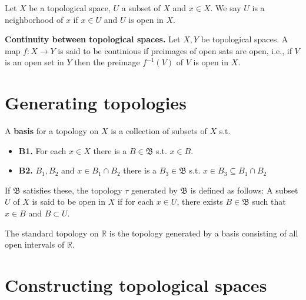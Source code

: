 \documentclass{article}
\theoremstyle{remark}
\begin{document}
\begin{definition}[Neighbourhoods]
    Let $X$ be a topological space,  $U$ a subset of $X$ and $x \in  X$. We say $ U$ is a neighborhood of $x$ if $ x \in
    U $ and $U$ is open in $X$.
\end{definition}

\begin{theorem}
    \textbf{Continuity between topological spaces.}
Let $X,Y$ be topological spaces. A map $f: X \to Y$ is said to be continious if preimages of open sats are open, i.e.,
if $V$ is an open set in $Y$ then the preimage $f^{-1} \left( V \right)$ of $V$ is open in $X$.
\end{theorem}

\section{ Generating topologies}%
\label{sec:chapter_4_generating_topologies}

\begin{definition}[Basis]
    A \textbf{basis} for a topology on $X$ is a collection of subsets of $X$ s.t.
\begin{itemize}
    \item \textbf{B1.} For each $x \in X$ there is a $B \in  \mathfrak{B} $ s.t. $x \in  B$.
    \item \textbf{B2.} $B_{1}, B_{2}$ and $x \in  B_{1} \cap B_{2} $ there is a $B_{3} \in  \mathfrak{B}  $ s.t. $x \in
        B_{3} \subseteq  B_{1} \cap B_{2} $
\end{itemize}

If $\mathfrak{B}  $ satisfies these, the topology $\tau $ generated by $ \mathfrak{B} $ is defined as follows: A subset
$U$ of $X$ is said to be open in $X$ if for each $x \in U$, there exists
$B \in  \mathfrak{B} $ such that $x \in B $ and $B \subset U $.

\end{definition}

\begin{definition}
    The standard topology on $ \mathbb{R} $ is the topology generated by a basis consisting of all open intervals of $
    \mathbb{R} $.
\end{definition}


\section{ Constructing topological spaces}%
\label{sec:chapter_5_constructing_topological_spaces}
\end{document}
